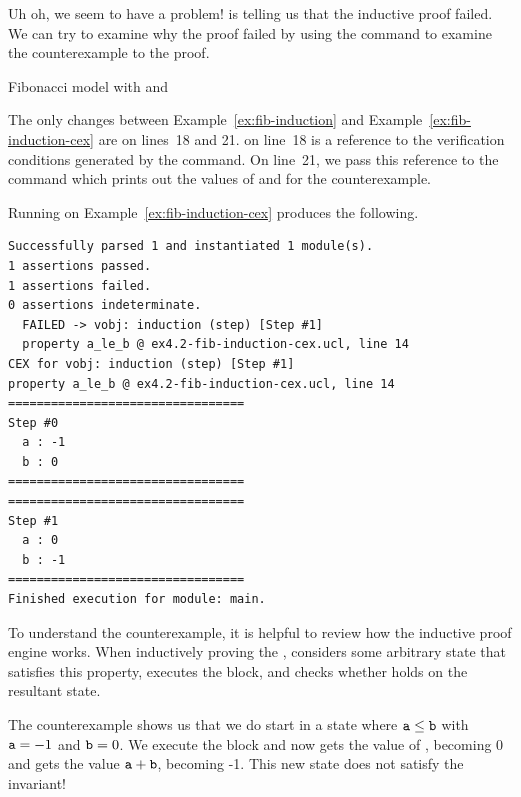 Uh oh, we seem to have a problem! \uclid{} is telling us that the inductive proof failed. We can try to examine why the proof failed by using the  command to examine the counterexample to the proof.

\begin{uclidlisting}[htbp]
    
    \caption{\uclid{} Fibonacci model with  and }
    \label{ex:fib-induction-cex}
\end{uclidlisting}

The only changes between Example~\ref{ex:fib-induction} and Example~\ref{ex:fib-induction-cex} are on lines~18 and 21.  on line~18 is a reference to the verification conditions generated by the  command. On line~21, we pass this reference to the  command which prints out the values of  and  for the counterexample.

Running \uclid{} on Example~\ref{ex:fib-induction-cex} produces the following.

\begin{Verbatim}[frame=single, samepage=true]
Successfully parsed 1 and instantiated 1 module(s).
1 assertions passed.
1 assertions failed.
0 assertions indeterminate.
  FAILED -> vobj: induction (step) [Step #1] 
  property a_le_b @ ex4.2-fib-induction-cex.ucl, line 14
CEX for vobj: induction (step) [Step #1] 
property a_le_b @ ex4.2-fib-induction-cex.ucl, line 14
=================================
Step #0
  a : -1
  b : 0
=================================
=================================
Step #1
  a : 0
  b : -1
=================================
Finished execution for module: main.
\end{Verbatim}

To understand the counterexample, it is helpful to review how the inductive proof engine works. When inductively proving the  , \uclid{} considers some arbitrary state that satisfies this property, executes the  block, and checks whether  holds on the resultant state.

The counterexample shows us that we do start in a state where $\texttt{a} \le \texttt{b}$ with $\texttt{a}=-1$ and $\texttt{b}=0$. We execute the  block and now  gets the value of , becoming 0 and  gets the value $\texttt{a} + \texttt{b}$, becoming -1. This new state does not satisfy the invariant!

